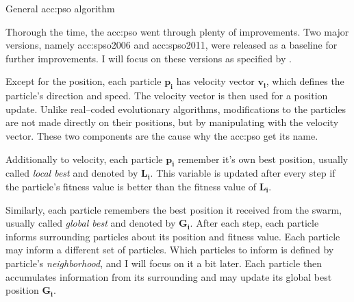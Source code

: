 \begin{algorithm}[b!]
    \caption{General \acrfull*{acc:pso} algorithm}
    \label{alg:PSOgeneral}
\end{algorithm}

Thorough the time, the \acrshort{acc:pso} went through plenty of improvements. Two major versions, namely \acrfull{acc:spso2006} and \acrfull{acc:spso2011}, were released as a baseline for further improvements. I will focus on these versions as specified by \citet{SPSO}.

Except for the position, each particle $\mathbf{p_i}$ has velocity vector $\mathbf{v_i}$, which defines the particle's direction and speed. The velocity vector is then used for a position update. Unlike real--coded evolutionary algorithms, modifications to the particles are not made directly on their positions, but by manipulating with the velocity vector. These two components are the cause why the \acrshort{acc:pso} get its name.

Additionally to velocity, each particle $\mathbf{p_i}$ remember it's own best position, usually called \emph{local best} and denoted by $\mathbf{L_i}$. This variable is updated after every step if the particle's fitness value is better than the fitness value of $\mathbf{L_i}$.

Similarly, each particle remembers the best position it received from the swarm, usually called \emph{global best} and denoted by $\mathbf{G_i}$. After each step, each particle informs surrounding particles about its position and fitness value. Each particle may inform a different set of particles. Which particles to inform is defined by particle's \emph{neighborhood}, and I will focus on it a bit later. Each particle then accumulates information from its surrounding and may update its global best position $\mathbf{G_i}$.

